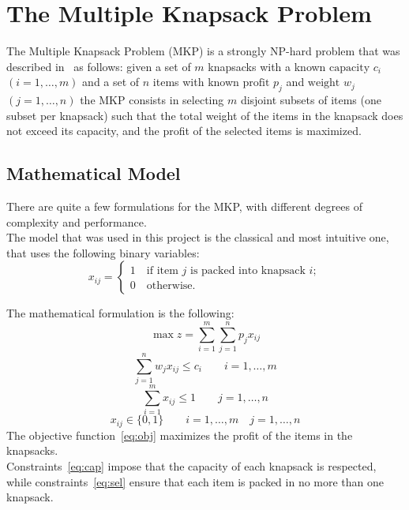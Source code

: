 \chapter{The Multiple Knapsack Problem}\label{ch:mkp}
The Multiple Knapsack Problem (MKP) is a strongly NP-hard problem
that was described in~\cite{mkp:2019} as follows:
given a set of \(m\) knapsacks with a known \(\text{capacity } c_{i}\)
\((i=1,\dots,m)\) and a set of \(n\) items with
known \(\text{profit } p_{j}\) and \(\text{weight } w_{j}\) \((j=1,\dots,n)\)
the MKP consists in selecting \(m\) disjoint subsets of items
(one subset per knapsack) such that the total weight of the items in the knapsack
does not exceed its capacity, and the profit of the selected items is maximized.


\section{Mathematical Model}\label{sec:model}
There are quite a few formulations for the MKP, with different degrees of
complexity and performance.\\
The model that was used in this project is the classical and most intuitive
one, that uses the following binary variables:
\[x_{ij}=
\begin{cases*}
    1 \quad \text{if item } j \text{ is packed into knapsack } i;\\
    0 \quad \text{otherwise}.
\end{cases*}
\]

The mathematical formulation is the following:
\begin{equation}
    \label{eq:obj}
    \max{z} = \sum_{i=1}^{m} \sum_{j=1}^{n} p_{j} x_{ij}
\end{equation}
\begin{equation}
    \label{eq:cap}
    \sum_{j=1}^{n} w_{j} x_{ij} \leq c_{i} \qquad i=1,\dots,m
\end{equation}
\begin{equation}
    \label{eq:sel}
    \sum_{i=1}^{m} x_{ij} \leq 1 \qquad j=1,\dots,n
\end{equation}
\begin{equation}
    x_{ij} \in \{0,1\} \qquad i=1,\dots,m \quad j=1,\dots,n
\end{equation}
The objective function~\eqref{eq:obj} maximizes the profit
of the items in the knapsacks.\\
Constraints~\eqref{eq:cap} impose that the capacity of each knapsack is respected,
while constraints~\eqref{eq:sel} ensure that each item
is packed in no more than one knapsack.


